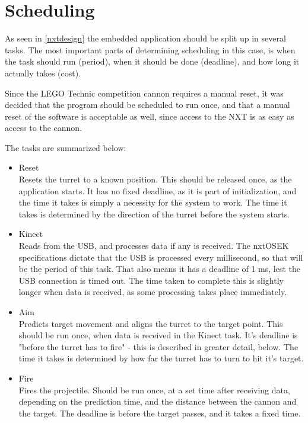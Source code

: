 \section{Scheduling}
\label{scheduling}
As seen in \autoref{nxtdesign} the embedded application should be split up in several tasks.
The most important parts of determining scheduling in this case, is when the task should run
(period), when it should be done (deadline), and how long it actually takes (cost).

Since the LEGO Technic competition cannon requires a manual reset, it was decided that
the program should be scheduled to run once, and that a manual reset of the software is
acceptable as well, since access to the NXT is as easy as access to the cannon.

The tasks are summarized below:

\begin{itemize}
  \item{Reset}\\
  Resets the turret to a known position. This should be released once, as the application starts.
  It has no fixed deadline, as it is part of initialization, and the time it takes is
  simply a necessity for the system to work. The time it takes is determined by the direction
  of the turret before the system starts.
  \item{Kinect}\\
  Reads from the USB, and processes data if any is received. The nxtOSEK specifications dictate
  that the USB is processed every millisecond, so that will be the period of this task. That also
  means it has a deadline of 1 ms, lest the USB connection is timed out. The time taken to complete
  this is slightly longer when data is received, as some processing takes place immediately.
  \item{Aim}\\
  Predicts target movement and aligns the turret to the target point. This should be run once,
  when data is received in the Kinect task. It's deadline is "before the turret has to fire" - this
  is described in greater detail, below. The time it takes is determined by how far the turret has
  to turn to hit it's target.
  \item{Fire}\\
  Fires the projectile. Should be run once, at a set time after receiving data, depending on the
  prediction time, and the distance between the cannon and the target. The deadline is before 
  the target passes, and it takes a fixed time.
\end{itemize}


